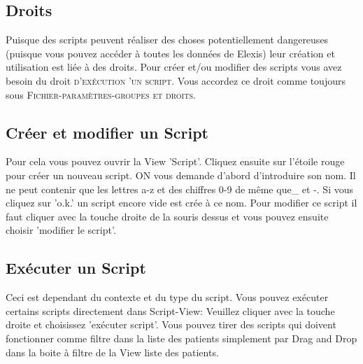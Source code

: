 \documentclass[a4paper]{scrartcl}
\begin{document}
\subsection{Droits}
Puisque des scripts peuvent réaliser des choses potentiellement dangereuses (puisque vous pouvez accéder à toutes les données de Elexis) leur création et utilisation est liée à des droits. Pour créer et/ou modifier des scripts vous avez besoin du droit \textsc{d'exécution 'un script}. Vous accordez ce droit comme toujours sous \textsc{Fichier-paramètres-groupes et droits}.

\subsection{Créer et modifier un Script}

Pour cela vous pouvez ouvrir la View 'Script'. Cliquez ensuite sur l'étoile rouge pour créer un nouveau script. ON vous demande d'abord d'introduire son nom. Il ne peut contenir que les lettres a-z et des chiffres 0-9 de même que\_ et -. Si vous cliquez sur 'o.k.' un script encore vide est crée à ce nom. Pour modifier ce script il faut cliquer avec la touche droite de la souris dessus et vous pouvez ensuite choisir 'modifier le script'.

\subsection{Exécuter un Script}

Ceci est dependant du contexte et du type du script. Vous pouvez exécuter certains scripts directement dans Script-View:
Veuillez cliquer avec la touche droite et choisissez 'exécuter script'. Vous pouvez tirer des scripts qui doivent fonctionner comme filtre dans la liste des patients simplement par Drag and Drop dans la boite à filtre de la View liste des patients.

\vspace{3mm}
\end{document}
